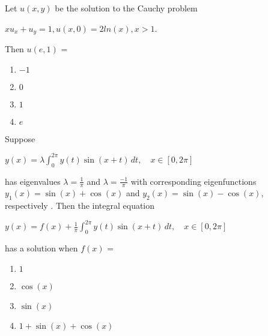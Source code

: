                 \item Let $u(x,y)$ be the solution to the Cauchy problem 
                \begin{center}
                    $xu_x+u_y = 1, u(x,0) = 2 ln(x), x>1$.
                \end{center}
                Then $u(e,1)$ =
                \begin{multicols}{4}
                \begin{enumerate}
                    \item $-1$
                    \item $0$
                    \item $1$
                    \item $e$
                \end{enumerate}
                    
                \end{multicols}

                \item Suppose 
                \begin{center}
                   $ y(x) = \lambda \int_{0}^{2\pi} y(t) \sin(x+t) \, dt, \quad x \in [0, 2\pi]$
                \end{center}
                has eigenvalues $\lambda=\frac{1}{\pi}$ and $\lambda=\frac{-1}{\pi}$ with corresponding eigenfunctions $y_1(x)=\sin{(x)}+\cos{(x)}$ and $y_2(x)=\sin{(x)}-\cos{(x)}$, respectively . Then the integral equation 
                \begin{center}
                   $ y(x) = f(x) + \frac{1}{\pi} \int_{0}^{2\pi} y(t) \sin(x+t) \, dt, \quad x \in [0, 2\pi]$
                \end{center}
                has a solution when $f(x)$ =
                \begin{multicols}{2}
                \begin{enumerate}
                    \item $1$
                    \item $\cos{(x)}$
                    \item $\sin{(x)}$
                    \item $1+\sin{(x)}+\cos{(x)}$
                \end{enumerate}
                    
                \end{multicols}

